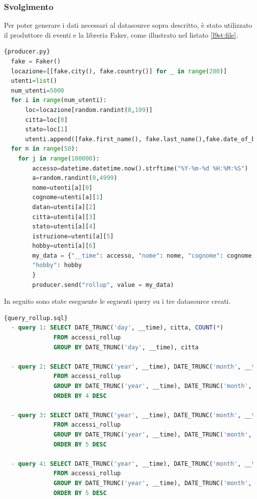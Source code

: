 \subsubsection{Svolgimento}
Per poter generare i dati necessari al \gls{datasource}{} sopra descritto, 
è stato utilizzato il produttore di eventi e la libreria \gls{Faker}{}, come illustrato nel listato \ref{l9st:file}.
\begin{lstlisting}[language=Python, caption=\texttt{producer\_rollup.py}, label=l9st:file]{producer.py}
  fake = Faker()
  locazione=[[fake.city(), fake.country()] for _ in range(200)]
  utenti=list()
  num_utenti=5000
  for i in range(num_utenti):
      loc=locazione[random.randint(0,199)]
      citta=loc[0]
      stato=loc[1]
      utenti.append([fake.first_name(), fake.last_name(),fake.date_of_birth(minimum_age=18, maximum_age=89).strftime("%Y-%m-%d"), citta, stato, fake.random_element(elements=("Scuola Secondaria", "Laurea triennale", "Laurea Magistrale", "Dottorato")), fake.random_element(elements=("Leggere","Viaggiare","Giocare a calcio","Giocare ai videogiochi","Fare sport")) ] )
  for n in range(50):
    for j in range(100000):
        accesso=datetime.datetime.now().strftime("%Y-%m-%d %H:%M:%S")
        a=random.randint(0,4999)
        nome=utenti[a][0]
        cognome=utenti[a][1]
        datan=utenti[a][2]
        citta=utenti[a][3]
        stato=utenti[a][4]
        istruzione=utenti[a][5]
        hobby=utenti[a][6]
        my_data = {"__time": accesso, "nome": nome, "cognome": cognome, "datan":  datan, "citta": citta, "stato": stato, "istruzione": istruzione,
        "hobby": hobby
        }
        producer.send("rollup", value = my_data) 
    \end{lstlisting}
In seguito sono state eseguente le seguenti query su i tre \gls{datasource}{} creati.
\begin{lstlisting}[language=SQL, caption=\texttt{query\_rollup.sql}, label=lst:file]{query_rollup.sql}
  - query 1: SELECT DATE_TRUNC('day', __time), citta, COUNT(*)
              FROM accessi_rollup
              GROUP BY DATE_TRUNC('day', __time), citta
              
  - query 2: SELECT DATE_TRUNC('year', __time), DATE_TRUNC('month', __time), stato, COUNT(*)
              FROM accessi_rollup
              GROUP BY DATE_TRUNC('year', __time), DATE_TRUNC('month', __time), stato
              ORDER BY 4 DESC
  
  - query 3: SELECT DATE_TRUNC('year', __time), DATE_TRUNC('month', __time), DATE_TRUNC('day', __time), stato, citta, COUNT(*) 
              FROM accessi_rollup
              GROUP BY DATE_TRUNC('year', __time), DATE_TRUNC('month', __time), DATE_TRUNC('day', __time), stato, citta
              ORDER BY 5 DESC
  
  - query 4: SELECT DATE_TRUNC('year', __time), DATE_TRUNC('month', __time), DATE_TRUNC('day', __time), DATE_TRUNC('hour', __time), stato, citta, COUNT(*) 
              FROM accessi_rollup
              GROUP BY DATE_TRUNC('year', __time), DATE_TRUNC('month', __time), DATE_TRUNC('day', __time), DATE_TRUNC('hour', __time), stato, citta
              ORDER BY 5 DESC
  \end{lstlisting}
